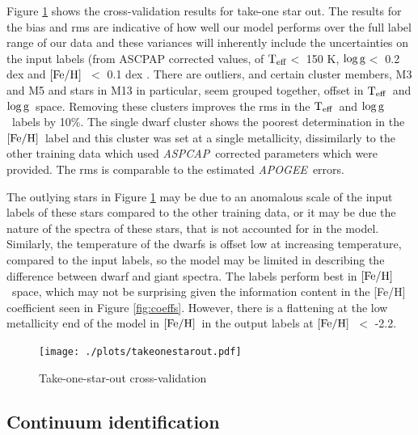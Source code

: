 \documentclass[12pt, preprint]{aastex}
\newcommand{\teff}{\mbox{$\rm T_{eff}$}}
\newcommand{\feh}{\mbox{$\rm [Fe/H]$}}
\newcommand{\logg}{\mbox{$\rm \log g$}}
\newcommand{\apogee}{\textsl{APOGEE}}
\newcommand{\aspcap}{\textsl{ASPCAP}}
\begin{document}
Figure \ref{fig:takeonestarout} shows the cross-validation results for take-one star out. The results for the bias and rms are indicative of how well our model performs over the full label range of our data and these variances will inherently include the uncertainties on the input labels (from ASCPAP corrected values, of \teff $<$ 150 K, \logg $<$ 0.2 dex and \feh\ $<$ 0.1 dex \citep{Meszaros2013}. There are outliers, and certain cluster members, M3 and M5 and stars in M13 in particular, seem grouped together, offset in \teff\ and \logg\ space. Removing these clusters improves the rms in the \teff\ and \logg\ labels by 10\%. The single dwarf cluster shows the poorest determination in the \feh\ label and this cluster was set at a single metallicity, dissimilarly to the other training data which used \aspcap\ corrected parameters which were provided. The rms is comparable to the estimated \apogee\ errors.

The outlying stars in Figure \ref{fig:takeonestarout} may be due to an anomalous scale of the input labels of these stars compared to the other training data, or it may be due the nature of the spectra of these stars, that is not accounted for in the model. Similarly, the temperature of the dwarfs is offset low at increasing temperature, compared to the input labels, so the model may be limited in describing the difference between dwarf and giant spectra. The labels perform best in \feh\ space, which may not be surprising given the information content in the [Fe/H] coefficient seen in Figure \ref{fig:coeffs}. However, there is a flattening at the low metallicity end of the model in \feh\ in the output labels at \feh\ $<$ -2.2. 



\begin{figure}[h!]
\centering
  \texttt{[image: ./plots/takeonestarout.pdf]}
\caption{Take-one-star-out cross-validation}
\label{fig:takeonestarout}
\end{figure}


\subsection{Continuum identification}
\end{document}
